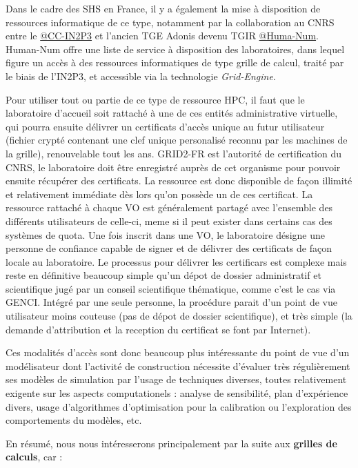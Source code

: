 Dans le cadre des SHS en France, il y a également la mise à disposition de ressources informatique de ce type, notamment par la collaboration au CNRS entre le \href{http://cc.in2p3.fr/}{@CC-IN2P3} et l'ancien TGE Adonis devenu TGIR \href{http://www.huma-num.fr/}{@Huma-Num}. Human-Num offre une liste de service à disposition des laboratoires, dans lequel figure un accès à des ressources informatiques de type grille de calcul, traité par le biais de l'IN2P3, et accessible via la technologie \textit{Grid-Engine}.

Pour utiliser tout ou partie de ce type de ressource HPC, il faut que le laboratoire d'accueil soit rattaché à une de ces entités administrative virtuelle, qui pourra ensuite délivrer un certificats d'accès unique au futur utilisateur (fichier crypté contenant une clef unique personalisé reconnu par les machines de la grille), renouvelable tout les ans. GRID2-FR est l'autorité de certification du CNRS, le laboratoire doit être enregistré auprès de cet organisme pour pouvoir ensuite récupérer des certificats. La ressource est donc disponible de façon illimité et relativement immédiate dès lors qu'on possède un de ces certificat. La ressource rattaché à chaque VO est généralement partagé avec l'ensemble des différents utilisateurs de celle-ci, meme si il peut exister dans certains cas des systèmes de quota. Une fois inscrit dans une VO, le laboratoire désigne une personne de confiance capable de signer et de délivrer des certificats de façon locale au laboratoire. Le processus pour délivrer les certificars est complexe mais reste en définitive beaucoup simple qu'un dépot de dossier administratif et scientifique jugé par un conseil scientifique thématique, comme c'est le cas via GENCI. Intégré par une seule personne, la procédure parait d'un point de vue utilisateur moins couteuse (pas de dépot de dossier scientifique), et très simple (la demande d'attribution et la reception du certificat se font par Internet). 

Ces modalités d'accès sont donc beaucoup plus intéressante du point de vue d'un modélisateur dont l'activité de construction nécessite d'évaluer très régulièrement ses modèles de simulation par l'usage de techniques diverses, toutes relativement exigente sur les aspects computationels : analyse de sensibilité, plan d'expérience divers, usage d'algorithmes d'optimisation pour la calibration ou l'exploration des comportements du modèles, etc.


En résumé, nous nous intéresserons principalement par la suite aux \textbf{grilles de calculs}, car :

